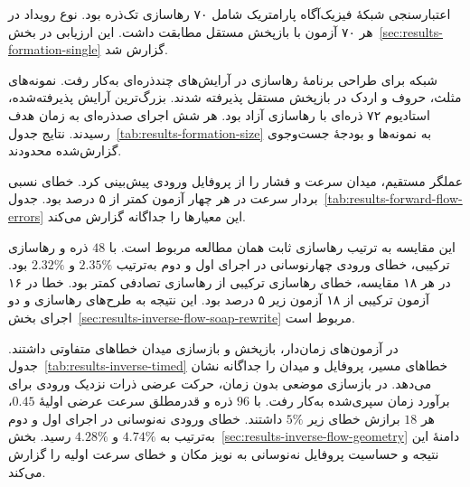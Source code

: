 \label{ch:conclusions}


اعتبارسنجی شبکهٔ فیزیک‌آگاه پارامتریک شامل ۷۰ رهاسازی تک‌ذره بود.
نوع رویداد در هر ۷۰ آزمون با بازپخش مستقل مطابقت داشت.
این ارزیابی در بخش~\ref{sec:results-formation-single} گزارش شد.

شبکه برای طراحی برنامهٔ رهاسازی در آرایش‌های چندذره‌ای به‌کار رفت.
نمونه‌های مثلث، حروف و اردک در بازپخش مستقل پذیرفته شدند.
بزرگ‌ترین آرایش پذیرفته‌شده، استادیوم ۷۲ ذره‌ای با رهاسازی آزاد بود.
هر شش اجرای صدذره‌ای به زمان هدف رسیدند.
نتایج جدول~\ref{tab:results-formation-size} به نمونه‌ها و بودجهٔ جست‌وجوی گزارش‌شده محدودند.


عملگر مستقیم، میدان سرعت و فشار را از پروفایل ورودی پیش‌بینی کرد.
خطای نسبی بردار سرعت در هر چهار آزمون کمتر از ۵ درصد بود.
جدول~\ref{tab:results-forward-flow-errors} این معیارها را جداگانه گزارش می‌کند.

این مقایسه به ترتیب رهاسازی ثابت همان مطالعه مربوط است.
با $48$ ذره و رهاسازی ترکیبی، خطای ورودی چهارنوسانی در اجرای اول و دوم به‌ترتیب $2.35\%$ و $2.32\%$ بود.
در هر ۱۸ مقایسه، خطای رهاسازی ترکیبی از رهاسازی تصادفی کمتر بود.
خطا در ۱۶ آزمون ترکیبی از ۱۸ آزمون زیر ۵ درصد بود.
این نتیجه به طرح‌های رهاسازی و دو اجرای بخش~\ref{sec:results-inverse-flow-soap-rewrite} مربوط است.

در آزمون‌های زمان‌دار، بازپخش و بازسازی میدان خطاهای متفاوتی داشتند.
جدول~\ref{tab:results-inverse-timed} خطاهای مسیر، پروفایل و میدان را جداگانه نشان می‌دهد.
در بازسازی موضعی بدون زمان، حرکت عرضی ذرات نزدیک ورودی برای برآورد زمان سپری‌شده به‌کار رفت.
با $96$ ذره و قدرمطلق سرعت عرضی اولیهٔ $0.45$، هر $18$ برازش خطای زیر $5\%$ داشتند. خطای ورودی نه‌نوسانی در اجرای اول و دوم به‌ترتیب به $4.74\%$ و $4.28\%$ رسید.
بخش~\ref{sec:results-inverse-flow-geometry} دامنهٔ این نتیجه و حساسیت پروفایل نه‌نوسانی به نویز مکان و خطای سرعت اولیه را گزارش می‌کند.


